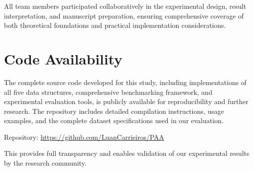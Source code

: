 \documentclass{sbc2023}
\begin{document}
All team members participated collaboratively in the experimental design, result interpretation, and manuscript preparation, ensuring comprehensive coverage of both theoretical foundations and practical implementation considerations.

\section*{Code Availability}
\label{sec:code_availability}

The complete source code developed for this study, including implementations of all five data structures, comprehensive benchmarking framework, and experimental evaluation tools, is publicly available for reproducibility and further research. The repository includes detailed compilation instructions, usage examples, and the complete dataset specifications used in our evaluation.

Repository: \url{https://github.com/LuanCarrieiros/PAA}

This provides full transparency and enables validation of our experimental results by the research community.



\end{document}
